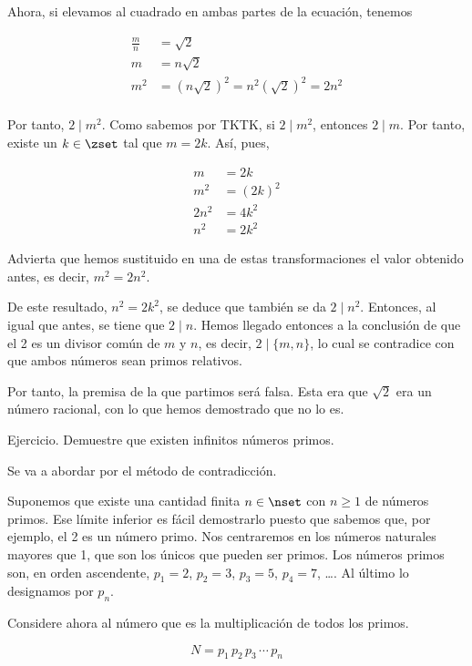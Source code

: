 Ahora, si elevamos al cuadrado en ambas partes de la ecuación, tenemos

\begin{align*}
  \frac{m}{n} &= \sqrt{2} \\
  m           &= n \sqrt{2} \\
  m^2
    &= \left(n \sqrt{2}\right)^2 = n^2 \left(\sqrt{2}\right)^2 = 2n^2 \\
\end{align*}

Por tanto, $2 \mid m^2$. Como sabemos por TKTK, si $2 \mid m^2$, entonces
$2 \mid m$. Por tanto, existe un $k \in \zset$ tal que $m = 2k$. Así,
pues,

\begin{align*}
  m     &= 2k \\
  m^2   &= (2k)^2 \\
  2n^2  &= 4k^2 \\
  n^2   &= 2k^2
\end{align*}

\noindent Advierta que hemos sustituido en una de estas transformaciones el
valor obtenido antes, es decir, $m^2 = 2n^2$.

De este resultado, $n^2 = 2k^2$, se deduce que también se da $2 \mid n^2$.
Entonces, al igual que antes, se tiene que $2 \mid n$. Hemos llegado
entonces a la conclusión de que el 2 es un divisor común de $m$ y $n$, es
decir, $2 \mid \{m, n\}$, lo cual se contradice con que ambos números sean
primos relativos.

Por tanto, la premisa de la que partimos será falsa. Esta era que $\sqrt{2}$
era un número racional, con lo que hemos demostrado que no lo es.

Ejercicio. Demuestre que existen infinitos números primos.

Se va a abordar por el método de contradicción.

Suponemos que existe una cantidad finita $n \in \nset$ con $n \geq 1$ de
números primos. Ese límite inferior es fácil demostrarlo puesto que sabemos
que, por ejemplo, el 2 es un número primo. Nos centraremos en los números
naturales mayores que 1, que son los únicos que pueden ser primos. Los
números primos son, en orden ascendente, $p_1 = 2$, $p_2 = 3$, $p_3 = 5$,
$p_4 = 7$, \ldots. Al último lo designamos por $p_n$.

Considere ahora al número que es la multiplicación de todos los primos.

$$ N = p_1 \, p_2 \, p_3 \, \cdots \, p_n $$

